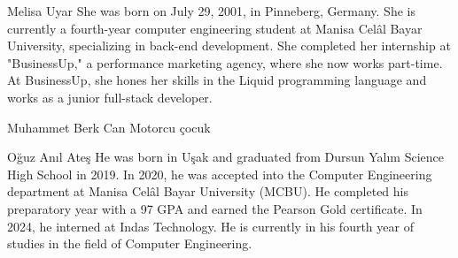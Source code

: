 \documentclass[a4paper,journal]{IEEEtran}
\begin{document}
\begin{IEEEbiography}{Melisa Uyar}
She was born on July 29, 2001, in Pinneberg, Germany.
She is currently a fourth-year computer engineering student at Manisa Celâl
Bayar University, specializing in back-end development.
She completed her internship at "BusinessUp," a performance marketing agency,
where she now works part-time.
At BusinessUp, she hones her skills in the Liquid programming language and
works as a junior full-stack developer.
\end{IEEEbiography}

\begin{IEEEbiography}{Muhammet Berk Can}
Motorcu çocuk
\end{IEEEbiography}

\begin{IEEEbiography}{Oğuz Anıl Ateş}
He was born in Uşak and graduated from Dursun Yalım Science High School in 2019.
In 2020, he was accepted into the Computer Engineering department at Manisa
Celâl Bayar University (MCBU).
He completed his preparatory year with a 97 GPA and earned the Pearson Gold
certificate.
In 2024, he interned at Indas Technology.
He is currently in his fourth year of studies in the field of Computer
Engineering.
\end{IEEEbiography}







\end{document}
